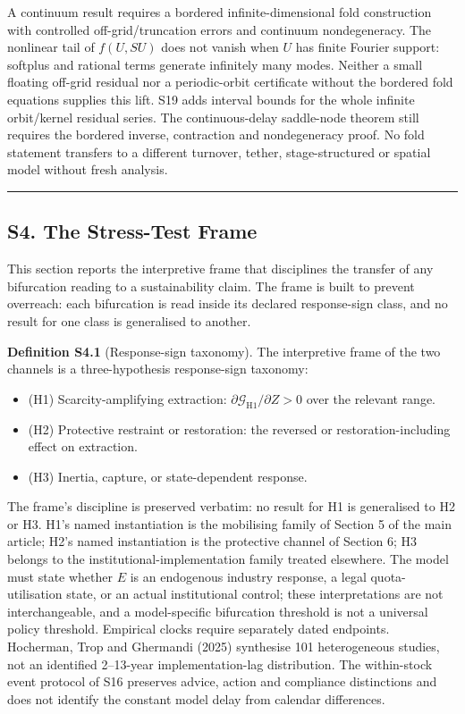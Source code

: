 \documentclass[
  10pt,
  a4paper,
]{article}
\providecommand{\tightlist}{%
  \setlength{\itemsep}{0pt}\setlength{\parskip}{0pt}}
\begin{document}
A continuum result requires a bordered infinite-dimensional fold
construction with controlled off-grid/truncation errors and continuum
nondegeneracy. The nonlinear tail of \(f(U,SU)\) does not vanish when
\(U\) has finite Fourier support: softplus and rational terms generate
infinitely many modes. Neither a small floating off-grid residual nor a
periodic-orbit certificate without the bordered fold equations supplies
this lift. S19 adds interval bounds for the whole infinite orbit/kernel
residual series. The continuous-delay saddle-node theorem still requires
the bordered inverse, contraction and nondegeneracy proof. No fold
statement transfers to a different turnover, tether, stage-structured or
spatial model without fresh analysis.

\begin{center}\rule{0.5\linewidth}{0.5pt}\end{center}

\subsection{S4. The Stress-Test Frame}\label{s4.-the-stress-test-frame}

This section reports the interpretive frame that disciplines the
transfer of any bifurcation reading to a sustainability claim. The frame
is built to prevent overreach: each bifurcation is read inside its
declared response-sign class, and no result for one class is generalised
to another.

\textbf{Definition S4.1} (Response-sign taxonomy). The interpretive
frame of the two channels is a three-hypothesis response-sign taxonomy:

\begin{itemize}
\tightlist
\item
  (H1) Scarcity-amplifying extraction:
  \(\partial\mathcal{G}_{\mathrm{H1}}/\partial Z > 0\) over the relevant
  range.
\item
  (H2) Protective restraint or restoration: the reversed or
  restoration-including effect on extraction.
\item
  (H3) Inertia, capture, or state-dependent response.
\end{itemize}

The frame's discipline is preserved verbatim: no result for H1 is
generalised to H2 or H3. H1's named instantiation is the mobilising
family of Section 5 of the main article; H2's named instantiation is the
protective channel of Section 6; H3 belongs to the
institutional-implementation family treated elsewhere. The model must
state whether \(E\) is an endogenous industry response, a legal
quota-utilisation state, or an actual institutional control; these
interpretations are not interchangeable, and a model-specific
bifurcation threshold is not a universal policy threshold. Empirical
clocks require separately dated endpoints. Hocherman, Trop and Ghermandi
(2025) synthesise 101 heterogeneous studies, not an identified
2--13-year implementation-lag distribution. The within-stock event
protocol of S16 preserves advice, action and compliance distinctions and
does not identify the constant model delay from calendar differences.
\end{document}
